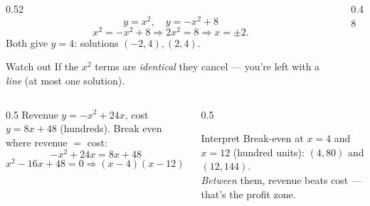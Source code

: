 \documentclass[aspectratio=169, 11pt]{beamer}
\newcommand{\lgrid}[4]{%
  \draw[step=1, linegray!45, thin] (#1,#3) grid (#2,#4);
  \draw[->, thick, charcoal] (#1,0)--(#2,0) node[below right, font=\tiny]{$x$};
  \draw[->, thick, charcoal] (0,#3)--(0,#4) node[left, font=\tiny]{$y$};}
\begin{document}
\begin{frame}[t, plain]
  \begin{columns}[T]
    \begin{column}{0.52\textwidth}
      \[ y=x^2,\quad y=-x^2+8 \]
      \[ x^2=-x^2+8\Rightarrow 2x^2=8\Rightarrow x=\pm2. \]
      Both give $y=4$: solutions $(-2,4),(2,4)$.
      \begin{block}{Watch out}
        If the $x^2$ terms are \emph{identical} they cancel --- you're left with a \emph{line} (at most one solution).
      \end{block}
    \end{column}
    \begin{column}{0.48\textwidth}
      \centering
    \end{column}
  \end{columns}
\end{frame}

\begin{frame}[t, plain]
  \begin{columns}[T]
    \begin{column}{0.5\textwidth}
      Revenue $y=-x^2+24x$, cost $y=8x+48$ (hundreds). Break even where revenue $=$ cost:
      \[ -x^2+24x=8x+48 \]
      \[ x^2-16x+48=0\Rightarrow(x-4)(x-12)=0. \]
    \end{column}
    \begin{column}{0.5\textwidth}
      \begin{block}{Interpret}
        Break-even at $x=4$ and $x=12$ (hundred units): $(4,80)$ and $(12,144)$. \\[2pt]
        \emph{Between} them, revenue beats cost --- that's the profit zone.
      \end{block}
    \end{column}
  \end{columns}
\end{frame}
\end{document}
